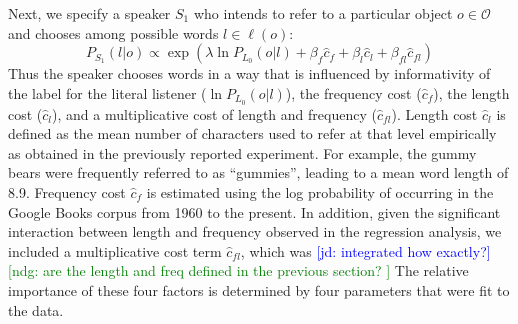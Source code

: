 \documentclass[10pt,letterpaper]{article}
\newcommand{\jd}[1]{\textcolor{Blue}{[jd: #1]}}
\newcommand{\red}[1]{\textcolor{Red}{#1}}
\newcommand{\ndg}[1]{\textcolor{Green}{[ndg: #1]}}
\newcommand{\denote}[1]{\mbox{ $[\![ #1 ]\!]$}}
\begin{document}
Next, we specify a speaker $S_1$ who intends to refer to a particular object $o \in \mathcal{O}$ and chooses among possible words $l \in \ell(o)$: 
$$P_{S_1}(l | o) \propto \exp(\lambda \ln P_{L_0}(o | l) + \beta_f \hat{c}_f  + \beta_l \hat{c}_l + \beta_{fl} \hat{c}_{fl} )$$
Thus the speaker chooses words in a way that is influenced by informativity of the label for the literal listener ($\ln P_{L_0}(o | l)$), the frequency cost ($\hat{c}_f$), the length cost ($\hat{c}_l$), and a multiplicative cost of length and frequency ($\hat{c}_{fl}$).
Length cost $\hat{c}_l$ is defined as the mean number of characters used to refer at that level empirically as obtained in the previously reported experiment. For example, the gummy bears were frequently referred to as ``gummies'', leading to a mean word length of 8.9. Frequency cost $\hat{c}_f$ is estimated using the log probability of occurring in the Google Books corpus from 1960 to the present. In addition, given the significant interaction between length and frequency observed in the regression analysis, we included a multiplicative cost term $\hat{c}_{fl}$, which was \jd{integrated how exactly?} \ndg{are the length and freq defined in the previous section? }
The relative importance of these four factors is determined by four parameters that were fit to the data.

\end{document}
